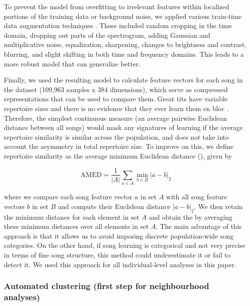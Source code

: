 \documentclass[9pt, onecolumn, twoside, lineno]{gsajnl}
\begin{document}
To prevent the model from overfitting to irrelevant features within localized portions of the training data or background noise, we applied various train-time data augmentation techniques \autocite{mumuni2022,perez2017,shorten2019}. These included random cropping in the time domain, dropping out parts of the spectrogram, adding Gaussian and multiplicative noise, equalization, sharpening, changes to brightness and contrast, blurring, and slight shifting in both time and frequency domains. This leads to a more robust model that can generalize better.

Finally, we used the resulting model to calculate feature vectors for each song in the dataset (109,963 samples x 384 dimensions), which serve as compressed representations that can be used to compare them. Great tits have variable repertoire sizes and there is no evidence that they ever learn them en bloc \autocite{mcgregor1982b, rivera-gutierrez2010a}. Therefore, the simplest continuous measure (an average pairwise Euclidean distance between all songs) would mask any signatures of learning if the average repertoire similarity is similar across the population, and does not take into account the asymmetry in total repertoire size. To improve on this, we define repertoire similarity as the average minimum Euclidean distance (), given by

\begin{equation} 
\label{eq1}
\text{AMED} = \frac{1}{|A|} \sum_{a \in A} \min_{b \in B} \left| a - b \right|_2
\end{equation}

where we compare each song feature vector $a$ in set $A$ with all song feature vectors $b$ in set $B$ and compute their Euclidean distance $\left| a - b \right|_2$. We then retain the minimum distance for each element in set $A$ and obtain the  by averaging these minimum distances over all elements in set $A$.
The main advantage of this approach is that it allows us to avoid imposing discrete population-wide song categories. On the other hand, if song learning is categorical and not very precise in terms of fine song structure, this method could underestimate it or fail to detect it. We used this approach for all individual-level analyses in this paper. 

\subsubsection{Automated clustering (first step for neighbourhood analyses)}
\end{document}
